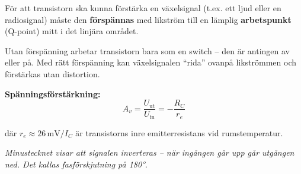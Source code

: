 \documentclass[a4paper,11pt,twoside]{book}
\newcommand{\emoji}[1]{{\emojifont #1}}
\begin{document}
\begin{bluebox}[title={\emoji{🔑} Transistorförstärkaren -- arbetspunkten}]
För att transistorn ska kunna förstärka en växelsignal (t.ex. ett
ljud eller en radiosignal) måste den \textbf{förspännas} med
likström till en lämplig \textbf{arbetspunkt} (Q-point) mitt i
det linjära området.

\medskip
Utan förspänning arbetar transistorn bara som en switch --
den är antingen av eller på. Med rätt förspänning kan
växelsignalen ``rida'' ovanpå likströmmen och förstärkas
utan distortion.

\medskip
\textbf{Spänningsförstärkning:}
\[ A_v = \frac{U_{\text{ut}}}{U_{\text{in}}} = -\frac{R_C}{r_e} \]

där $r_e \approx 26\,\text{mV} / I_C$ är transistorns inre
emitterresistans vid rumstemperatur.

\medskip
{\small\itshape Minustecknet visar att signalen inverteras --
när ingången går upp går utgången ned. Det kallas fasförskjutning
på 180°.}
\end{bluebox}
\end{document}
